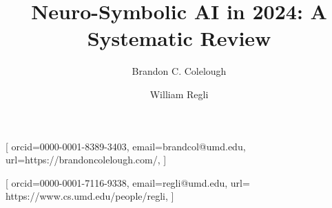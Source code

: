 \documentclass[hf]{ceurart}
\begin{document}


\title{Neuro-Symbolic AI in 2024: A Systematic Review}


\author[1]{Brandon C. Colelough}[%
orcid=0000-0001-8389-3403,
email=brandcol@umd.edu,
url=https://brandoncolelough.com/,
]
\cormark[1]
\address[1]{University of Maryland, College Park,
  8125 Paint Branch Dr, College Park, MD 20742}



\author[2]{William Regli}[%
orcid=0000-0001-7116-9338,
email=regli@umd.edu,
url= https://www.cs.umd.edu/people/regli,
]

\end{document}
